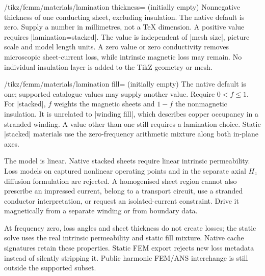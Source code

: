 \begin{key}{/tikz/femm/materials/lamination thickness= (initially empty)}
Nonnegative thickness of one conducting sheet, excluding insulation. The native
default is zero. Supply a number in millimetres, not a TeX dimension.
A positive value requires |lamination=stacked|. The value is
independent of |mesh size|, picture scale and model length units. A zero value
or zero conductivity removes microscopic sheet-current loss, while intrinsic
magnetic loss may remain. No individual insulation layer is added to the TikZ
geometry or mesh.
\end{key}
\begin{key}{/tikz/femm/materials/lamination fill= (initially empty)}
The native default is one; supported catalogue values may supply another value.
Require $0<f\leq1$. For |stacked|, $f$ weights the magnetic sheets and $1-f$
the nonmagnetic insulation. It is unrelated to |winding fill|, which describes
copper occupancy in a stranded winding. A value other than one still requires
a lamination choice. Static |stacked| materials use the zero-frequency arithmetic
mixture along both in-plane axes.
\end{key}

The model is linear. Native stacked sheets require linear intrinsic permeability.
Loss models on captured nonlinear operating points and in the separate axial
$H_z$ diffusion formulation are rejected. A homogenised sheet region cannot
also prescribe an impressed current, belong to a transport circuit, use a
stranded conductor interpretation, or request an isolated-current constraint.
Drive it magnetically from a separate winding or from boundary data.

At frequency zero, loss angles and sheet thickness do not create losses; the
static solve uses the real intrinsic permeability and static fill mixture.
Native cache signatures retain these properties. Static FEM export rejects
new loss metadata instead of silently stripping it. Public harmonic FEM/ANS
interchange is still outside the supported subset.

